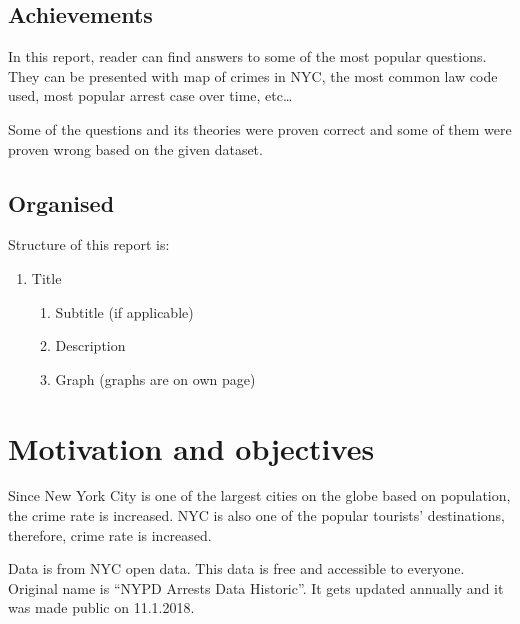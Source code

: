\documentclass{article}\usepackage[]{graphicx}\usepackage[]{color}
\begin{document}
        \subsection{Achievements}
        In this report, reader can find answers to some of the most popular questions. They can be                presented with map of crimes in NYC, the most common law code used, most popular arrest case over         time, etc…\vspace{5mm}
      
        Some of the questions and its theories were proven correct and some of them were proven wrong             based on the given dataset. 
      
        \subsection{Organised}
        Structure of this report is:
        \begin{enumerate} 
          \item Title
            \begin{enumerate} 
              \item	Subtitle (if applicable)
              \item	Description
              \item	Graph (graphs are on own page)
            \end{enumerate}
        \end{enumerate}
        
  \maketitle
    \newpage
      \section{Motivation and objectives} 
        Since New York City is one of the largest cities on the globe based on population, the crime rate         is increased. NYC is also one of the popular tourists’ destinations, therefore, crime rate is             increased.\vspace{5mm}

        Data is from NYC open data. This data is free and accessible to everyone. Original name is “NYPD          Arrests Data Historic”. It gets updated annually and it was made public on 11.1.2018.\vspace{5mm}
\end{document}
